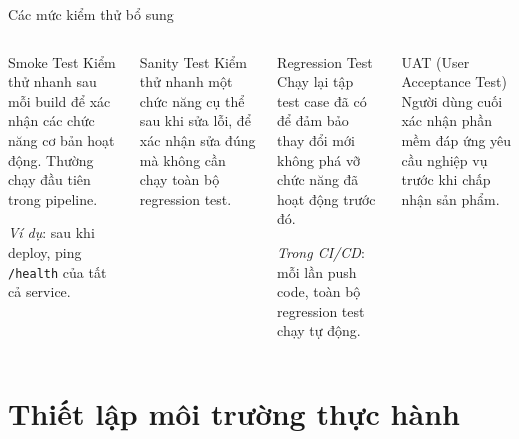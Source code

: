 \documentclass[aspectratio=169,12pt]{beamer}
\begin{document}
\begin{frame}{Các mức kiểm thử bổ sung}
  \begin{columns}
    \begin{block}{Smoke Test}
      Kiểm thử nhanh sau mỗi build để xác nhận các chức năng cơ bản
      hoạt động. Thường chạy đầu tiên trong pipeline.

      \vspace{0.3em}
      \textit{Ví dụ}: sau khi deploy, ping \texttt{/health} của tất cả service.
    \end{block}

    \begin{block}{Sanity Test}
      Kiểm thử nhanh một chức năng cụ thể sau khi sửa lỗi, để xác nhận
      sửa đúng mà không cần chạy toàn bộ regression test.
    \end{block}

    \begin{block}{Regression Test}
      Chạy lại tập test case đã có để đảm bảo thay đổi mới không phá vỡ
      chức năng đã hoạt động trước đó.

      \vspace{0.3em}
      \textit{Trong CI/CD}: mỗi lần push code, toàn bộ regression test
      chạy tự động.
    \end{block}

    \begin{block}{UAT (User Acceptance Test)}
      Người dùng cuối xác nhận phần mềm đáp ứng yêu cầu nghiệp vụ
      trước khi chấp nhận sản phẩm.
    \end{block}
  \end{columns}
\end{frame}

\section{Thiết lập môi trường thực hành}
\end{document}
